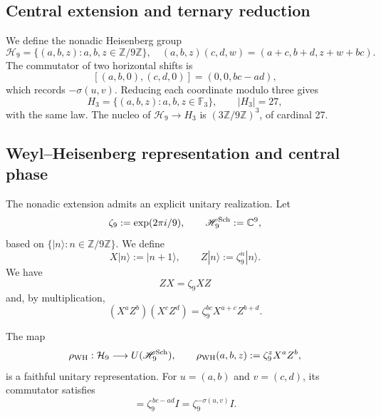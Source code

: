 \subsection{Central extension and ternary reduction}

We define the nonadic Heisenberg group
\begin{equation}
 \mathcal H_9=\{(a,b,z):a,b,z\in\mathbb Z/9\mathbb Z\},
 \quad
 (a,b,z)(c,d,w)=(a+c,b+d,z+w+bc).
 \label{x_reciprocidad:p12-83-c20-s6:eq:heisenberg-9-nuevo}
\end{equation}
The commutator of two horizontal shifts is
\[
 [(a,b,0),(c,d,0)]=(0,0,bc-ad),
\]
which records \(-\sigma(u,v)\). Reducing each coordinate modulo three
gives
\begin{equation}
 H_3=\{(a,b,z):a,b,z\in\mathbb F_3\},\qquad |H_3|=27,
 \label{x_reciprocidad:p12-83-c20-s6:eq:heisenberg-3-nuevo}
\end{equation}
with the same law. The nucleo of
\(\mathcal H_9\to H_3\) is
\((3\mathbb Z/9\mathbb Z)^3\), of cardinal 27.

\subsection{Weyl--Heisenberg representation and central phase}

The nonadic extension admits an explicit unitary realization. Let
\[
 \zeta_9:=\exp(2\pi i/9),
 \qquad
 \mathscr H_9^{\rm Sch}:=\mathbb C^9,
\]
based on \(\{|n\rangle:n\in\mathbb Z/9\mathbb Z\}\). We define
\begin{equation}
 X|n\rangle:=|n+1\rangle,
 \qquad
 Z|n\rangle:=\zeta_9^n|n\rangle.
 \label{x_reciprocidad:p12-83-c20-s6:eq:weyl-desplazamiento-fase-u029}
\end{equation}
We have
\[
 ZX=\zeta_9XZ
\]
and, by multiplication,
\begin{equation}
 (X^aZ^b)(X^cZ^d)
 =\zeta_9^{bc}X^{a+c}Z^{b+d}.
 \label{x_reciprocidad:p12-83-c20-s6:eq:cociclo-weyl-nonadico-u029}
\end{equation}

\begin{theorem}
\label{x_reciprocidad:p12-83-c20-s6:thm:representacion-weyl-heisenberg-u029}
The map
\begin{equation}
 \rho_{\rm WH}:\mathcal H_9\longrightarrow
 U(\mathscr H_9^{\rm Sch}),
 \qquad
 \rho_{\rm WH}(a,b,z):=\zeta_9^zX^aZ^b,
 \label{x_reciprocidad:p12-83-c20-s6:eq:representacion-weyl-heisenberg-u029}
\end{equation}
is a faithful unitary representation. For
\(u=(a,b)\) and \(v=(c,d)\), its commutator satisfies
\begin{equation}
 [\rho_{\rm WH}(u,0),\rho_{\rm WH}(v,0)]
 =\zeta_9^{\,bc-ad}I
 =\zeta_9^{-\sigma(u,v)}I.
 \label{x_reciprocidad:p12-83-c20-s6:eq:conmutador-weyl-holonomia-u029}
\end{equation}
\end{theorem}

